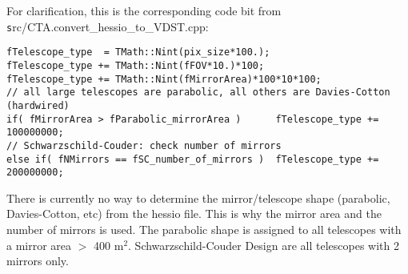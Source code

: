 \documentclass[titlepage,a4paper,twoside,11pt]{report}
\begin{document}
For clarification, this is the corresponding code bit from {\texttt src/CTA.convert\_hessio\_to\_VDST.cpp}:

\begin{lstlisting}
fTelescope_type  = TMath::Nint(pix_size*100.);
fTelescope_type += TMath::Nint(fFOV*10.)*100;
fTelescope_type += TMath::Nint(fMirrorArea)*100*10*100;
// all large telescopes are parabolic, all others are Davies-Cotton (hardwired)
if( fMirrorArea > fParabolic_mirrorArea )      fTelescope_type += 100000000;
// Schwarzschild-Couder: check number of mirrors
else if( fNMirrors == fSC_number_of_mirrors )  fTelescope_type += 200000000;
\end{lstlisting}

 There is currently no way to determine the mirror/telescope shape (parabolic, Davies-Cotton, etc) from the hessio file. This is why the mirror area and the number of mirrors is used. 
The parabolic shape is assigned to all telescopes with a mirror area  $>$ 400 m$^2$.
Schwarzschild-Couder Design are all telescopes with 2 mirrors only.





%
%
%

\end{document}
